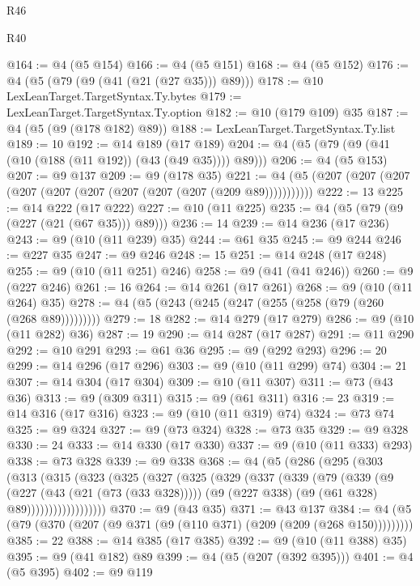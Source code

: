 \begin{lexlean}{R46}
\begin{lexlean}{R40}
\begin{coremodule}
{{{{{{{{{{{{{{{{{{{{{{{{{{{{{{{{{{{{{{{{{{{{{{{{{{{{{{{{{{{{{{{{{{{{{{{{{{{{{{{{{{{{{{{{{{{{{{{{{{{{{{{{{{{{{@164 := @4 (@5 @154)
@166 := @4 (@5 @151)
@168 := @4 (@5 @152)
@176 := @4 (@5 (@79 (@9 (@41 (@21 (@27 @35))) @89)))
@178 := @10 LexLeanTarget.TargetSyntax.Ty.bytes
@179 := LexLeanTarget.TargetSyntax.Ty.option
@182 := @10 (@179 @109) @35
@187 := @4 (@5 (@9 (@178 @182) @89))
@188 := LexLeanTarget.TargetSyntax.Ty.list
@189 := 10
@192 := @14 @189 (@17 @189)
@204 := @4 (@5 (@79 (@9 (@41 (@10 (@188 (@11 @192)) (@43 (@49 @35)))) @89)))
@206 := @4 (@5 @153)
@207 := @9 @137
@209 := @9 (@178 @35)
@221 := @4 (@5 (@207 (@207 (@207 (@207 (@207 (@207 (@207 (@207 (@207 (@209 @89)))))))))))
@222 := 13
@225 := @14 @222 (@17 @222)
@227 := @10 (@11 @225)
@235 := @4 (@5 (@79 (@9 (@227 (@21 (@67 @35))) @89)))
@236 := 14
@239 := @14 @236 (@17 @236)
@243 := @9 (@10 (@11 @239) @35)
@244 := @61 @35
@245 := @9 @244
@246 := @227 @35
@247 := @9 @246
@248 := 15
@251 := @14 @248 (@17 @248)
@255 := @9 (@10 (@11 @251) @246)
@258 := @9 (@41 (@41 @246))
@260 := @9 (@227 @246)
@261 := 16
@264 := @14 @261 (@17 @261)
@268 := @9 (@10 (@11 @264) @35)
@278 := @4 (@5 (@243 (@245 (@247 (@255 (@258 (@79 (@260 (@268 @89)))))))))
@279 := 18
@282 := @14 @279 (@17 @279)
@286 := @9 (@10 (@11 @282) @36)
@287 := 19
@290 := @14 @287 (@17 @287)
@291 := @11 @290
@292 := @10 @291
@293 := @61 @36
@295 := @9 (@292 @293)
@296 := 20
@299 := @14 @296 (@17 @296)
@303 := @9 (@10 (@11 @299) @74)
@304 := 21
@307 := @14 @304 (@17 @304)
@309 := @10 (@11 @307)
@311 := @73 (@43 @36)
@313 := @9 (@309 @311)
@315 := @9 (@61 @311)
@316 := 23
@319 := @14 @316 (@17 @316)
@323 := @9 (@10 (@11 @319) @74)
@324 := @73 @74
@325 := @9 @324
@327 := @9 (@73 @324)
@328 := @73 @35
@329 := @9 @328
@330 := 24
@333 := @14 @330 (@17 @330)
@337 := @9 (@10 (@11 @333) @293)
@338 := @73 @328
@339 := @9 @338
@368 := @4
    (@5
      (@286
        (@295
          (@303
            (@313
              (@315
                (@323
                  (@325
                    (@327
                      (@325
                        (@329
                          (@337
                            (@339
                              (@79
                                (@339
                                  (@9
                                    (@227 (@43 (@21 (@73 (@33 @328)))))
                                    (@9 (@227 @338) (@9 (@61 @328) @89))))))))))))))))))
@370 := @9 (@43 @35)
@371 := @43 @137
@384 := @4 (@5 (@79 (@370 (@207 (@9 @371 (@9 (@110 @371) (@209 (@209 (@268 @150)))))))))
@385 := 22
@388 := @14 @385 (@17 @385)
@392 := @9 (@10 (@11 @388) @35)
@395 := @9 (@41 @182) @89
@399 := @4 (@5 (@207 (@392 @395)))
@401 := @4 (@5 @395)
@402 := @9 @119
}}}}}}}}}}}}}}}}}}}}}}}}}}}}}}}}}}}}}}}}}}}}}}}}}}}}}}}}}}}}}}}}}}}}}}}}}}}}}}}}}}}}}}}}}}}}}}}}}}}}}}}}}}}}}
\end{coremodule}
\end{lexlean}
\end{lexlean}
